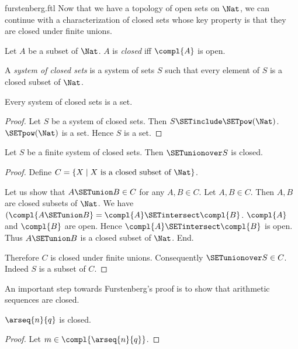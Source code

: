 \documentclass{article}
\begin{document}
\begin{smodule}{furstenberg.ftl}
Now that we have a topology of open sets on $\Nat$, we can continue
with a characterization of closed sets whose key property is that they are
closed under finite unions.

\begin{forthel}
  \begin{definition}
    Let $A$ be a subset of $\Nat$.
    $A$ is \emph{closed} iff $\compl{A}$ is open.
  \end{definition}

  \begin{definition}
    A \emph{system of closed sets} is a system of sets $S$ such that every element of
    $S$ is a closed subset of $\Nat$.
  \end{definition}

  \begin{lemma}
    Every system of closed sets is a set.
  \end{lemma}
  \begin{proof}
    Let $S$ be a system of closed sets.
    Then $S \SETinclude \SETpow(\Nat)$.
    $\SETpow(\Nat)$ is a set.
    Hence $S$ is a set.
  \end{proof}

  \begin{lemma}
    Let $S$ be a finite system of closed sets.
    Then $\SETunionover S$ is closed.
  \end{lemma}
  \begin{proof}
    Define $C = \{ X \mid X \text{ is a closed subset of } \Nat \}$.

    Let us show that $A \SETunion B \in C$ for any $A, B \in C$.
      Let $A, B \in C$.
      Then $A, B$ are closed subsets of $\Nat$.
      We have $(\compl{A \SETunion B} = \compl{A} \SETintersect \compl{B}$. %
      $\compl{A}$ and $\compl{B}$ are open.
      Hence $\compl{A} \SETintersect \compl{B}$ is open.
      Thus $A \SETunion B$ is a closed subset of $\Nat$.
    End.

    Therefore $C$ is closed under finite unions.
    Consequently $\SETunionover S \in C$.
    Indeed $S$ is a subset of $C$.
  \end{proof}
\end{forthel}

An important step towards Furstenberg's proof is to show that arithmetic
sequences are closed.

\begin{forthel}
  \begin{lemma}
    $\arseq{n}{q}$ is closed.
  \end{lemma}
  \begin{proof}
    Let $m \in \compl{\arseq{n}{q}}$.


\end{proof}
\end{forthel}
\end{smodule}
\end{document}
